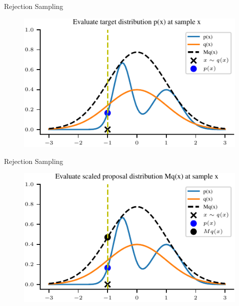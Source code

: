 \documentclass[handout]{beamer}
\begin{document}
    \begin{frame}{Rejection Sampling}
        \begin{figure}
            \centering
            \includegraphics{../figures/sampling/rejection-sampling--1.0-True-True-True-True-True-False-False-False.pdf}
        \end{figure}
    \end{frame}

    \begin{frame}{Rejection Sampling}
        \begin{figure}
            \centering
            \includegraphics{../figures/sampling/rejection-sampling--1.0-True-True-True-True-True-True-False-False.pdf}
        \end{figure}
    \end{frame}
\end{document}
